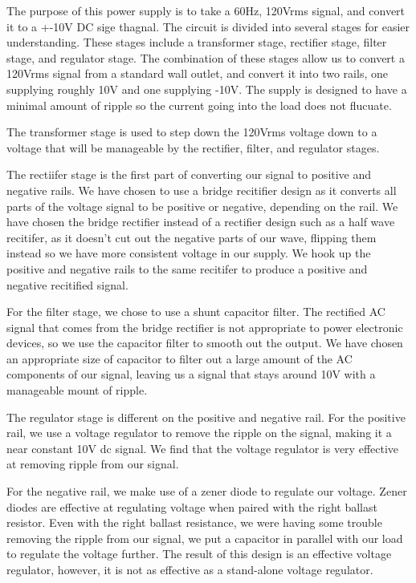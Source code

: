 \documentclass[12pt]{article}
\begin{document}
The purpose of this power supply is to take a 60Hz, 120Vrms signal, and convert it to a +-10V DC sige thagnal. The circuit is divided into
several stages for easier understanding. These stages include a transformer stage, rectifier stage, filter stage, and regulator stage. The combination 
of these stages allow us to convert a 120Vrms signal from a standard wall outlet, and convert it into two rails, one supplying roughly 10V and one supplying -10V. 
The supply is designed to have a minimal amount of ripple so the current going into the load does not flucuate.

The transformer stage is used to step down the 120Vrms voltage down to a voltage that will be manageable by the rectifier, filter, and regulator stages.

The rectiifer stage is the first part of converting our signal to positive and negative rails. We have chosen to use a bridge recitifier design as it converts all parts of the voltage signal 
to be positive or negative, depending on the rail. We have chosen the bridge rectifier instead of a rectifier design such as a half wave recitifer, as it doesn't cut out the negative parts of our wave, flipping them instead 
so we have more consistent voltage in our supply. We hook up the positive and negative rails to the same recitifer to produce a positive and negative recitified signal.

For the filter stage, we chose to use a shunt capacitor filter. The rectified AC signal that comes from the bridge rectifier is not appropriate to power electronic devices, so we use the capacitor filter to smooth out the output. We have chosen 
an appropriate size of capacitor to filter out a large amount of the AC components of our signal, leaving us a signal that stays around 10V with a manageable mount of ripple.

The regulator stage is different on the positive and negative rail. For the positive rail, we use a voltage regulator to remove the ripple on the signal, making it a near constant 10V dc signal. We find that the voltage regulator is very effective at removing 
ripple from our signal.

For the negative rail, we make use of a zener diode to regulate our voltage. Zener diodes are effective at regulating voltage when paired with the right ballast resistor. Even with the right ballast resistance, we were having some trouble removing the ripple from our signal, 
we put a capacitor in parallel with our load to regulate the voltage further. The result of this design is an effective voltage regulator, however, it is not as effective as a stand-alone voltage regulator.
\end{document}
